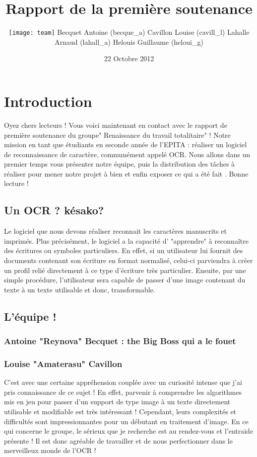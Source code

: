 \documentclass [french,12pt]{article}
\title{Rapport de la première soutenance}
\author{\texttt{[image: team]} \andcr Becquet Antoine (becque\_a) \andcr Cavillon Louise (cavill\_l) \andcr Lahalle Arnaud (lahall\_a) \andcr Helouis Guillaume (heloui\_g)}
\date{22 Octobre 2012}
\begin{document}
\clearpage
\tableofcontents
\clearpage



\section{Introduction}

Oyez chers lecteurs ! Vous voici maintenant en contact avec le rapport de première soutenance du groupe" Renaissance du travail totalitaire" ! 
Notre mission en tant que étudiants en seconde année de l'EPITA  : réaliser un logiciel de reconnaissance de caractère, communément appelé OCR.
Nous allons dans un premier temps vous présenter notre équipe, puis la distribution des tâches à réaliser pour mener notre projet à bien et enfin exposer ce qui a été fait . Bonne lecture !  


\subsection{Un OCR ? késako?}

Le logiciel que nous devons réaliser reconnait les caractères manuscrits et imprimés. Plus précisément, le logiciel a la capacité d' "apprendre" à reconnaître des écritures ou symboles particuliers. En effet,  si un utilisateur lui fournit des documents contenant son écriture en format normalisé, celui-ci parviendra à créer un profil relié directement à ce type d'écriture très particulier.
Ensuite, par une simple procédure, l'utilisateur sera capable de passer d'une image contenant du texte à un texte utilisable et donc, transformable.

\subsection{L'équipe ! }
\subsubsection{Antoine "Reynova" Becquet : the Big Boss qui a le fouet}


\subsubsection{Louise "Amaterasu" Cavillon}
C'est avec une certaine appréhension couplée avec un curiosité intense que j'ai pris connaissance de ce sujet ! En effet, parvenir à comprendre les algorithmes mis en jeu pour passer d'un support de type image à un texte directement utilisable et modifiable est très intéressant ! Cependant, leurs complexités et difficultés sont impressionnantes pour un débutant en traitement d'image. En ce qui concerne le groupe, le sérieux que je recherche est au rendez-vous et l'entraide présente ! Il est donc agréable de travailler et de nous perfectionner dans le merveilleux monde de l'OCR ! 
\end{document}
